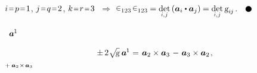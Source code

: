 \vspace{-0.1em}\noindent
${i \narroweq p \narroweq 1}$, ${j \narroweq q \narroweq 2}$, ${k \narroweq r \narroweq 3}$ ${\,\Rightarrow}$ ${\permutationsparitysymbols{123} \hspace{.2ex} \permutationsparitysymbols{123} \hspace{-0.15ex} = \underset{\raisebox{.15em}{\scalebox{.7}{$i$,$\hspace{.15ex}j$}}}{\determinant} \left( \bm{a}_i \dotp \bm{a}_j \right) \hspace{-0.1ex} = \underset{\raisebox{.15em}{\scalebox{.7}{$i$,$\hspace{.15ex}j$}}}{\determinant} \, \textsl{g}_{i\hspace{-0.1ex}j}}$.
${ \hspace{.6em}
\tikz[baseline=-0.6ex] \draw [color=black, fill=black] (0, 0) circle (.8ex); }$

~${\bm{a}^{\hspace{-0.1ex}1}\hspace{-0.1ex}}$

\nopagebreak\vspace{.8em}\begin{equation*}
\begin{array}{l@{\hspace{.3em}}c@{\hspace{.36em}}r}
\pm \hspace{.33ex} 2 \hspace{.1ex} \scalebox{0.95}[0.96]{$\sqrt{\hspace{-0.36ex}\mathstrut{\textsl{g}}}$} \hspace{.5ex} \bm{a}^{\hspace{-0.1ex}1} & = & \bm{a}_2 \times \bm{a}_3 \hspace{.2ex} \tikzmark{BeginPlusToMinus} - \hspace{.2ex} \bm{a}_3 \times \bm{a}_2 \tikzmark{EndPlusToMinus}
\hspace{.2ex} ,
\end{array}
\end{equation*}%
%
{${\scriptstyle {+ \hspace{.4ex} \bm{a}_2 \hspace{.1ex} \times \hspace{.2ex} \bm{a}_3}}$}

